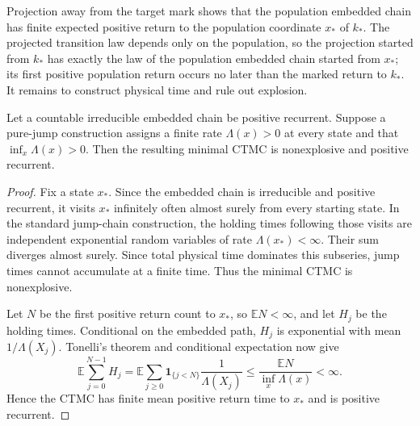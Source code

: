 Projection away from the target mark shows that the population embedded chain
has finite expected positive return to the population coordinate \(x_*\) of
\(k_*\).  The projected transition law depends only on the population, so the
projection started from \(k_*\) has exactly the law of the population embedded
chain started from \(x_*\); its first positive population return occurs no
later than the marked return to \(k_*\).
It remains to construct physical time and rule out explosion.

\begin{proposition}\label{prop:ctmc}
Let a countable irreducible embedded chain be positive recurrent.  Suppose a
pure-jump construction assigns a finite rate \(\Lambda(x)>0\) at every state
and that \(\inf_x\Lambda(x)>0\).  Then the resulting minimal CTMC is
nonexplosive and positive recurrent.
\end{proposition}

\begin{proof}
Fix a state \(x_*\).  Since the embedded chain is irreducible and positive
recurrent, it visits \(x_*\) infinitely often almost surely from every
starting state.  In the standard jump-chain construction, the holding times
following those visits are independent exponential random variables of rate
\(\Lambda(x_*)<\infty\).  Their sum diverges almost surely.  Since total
physical time dominates this subseries, jump times cannot accumulate at a
finite time.  Thus the minimal CTMC is nonexplosive.

Let \(N\) be the first positive return count to \(x_*\), so
\(\mathbb EN<\infty\), and let \(H_j\) be the holding times.  Conditional on
the embedded path, \(H_j\) is exponential with mean \(1/\Lambda(X_j)\).
Tonelli's theorem and conditional expectation now give
\[
 \mathbb E\sum_{j=0}^{N-1}H_j
 =\mathbb E\sum_{j\ge0}\mathbf1_{\{j<N\}}
   \frac1{\Lambda(X_j)}
 \le\frac{\mathbb EN}{\inf_x\Lambda(x)}<\infty.
\]
Hence the CTMC has finite mean positive return time to \(x_*\) and is
positive recurrent.
\end{proof}

